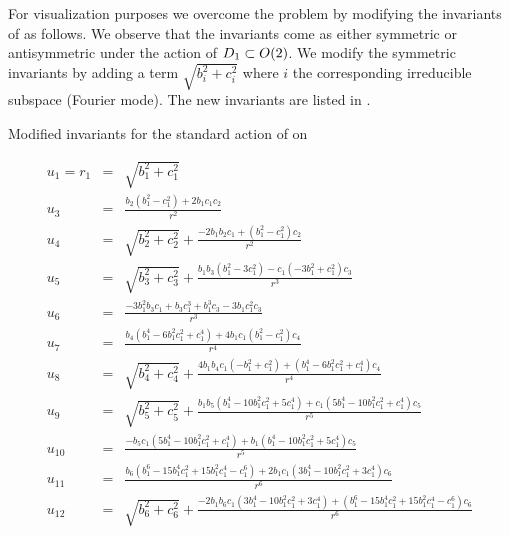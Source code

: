 For visualization purposes we overcome the problem by modifying
the invariants of  as follows. We observe
that the invariants come as either symmetric or antisymmetric
under the action of $D_{1}\subset O(2)$. We modify the
symmetric invariants by adding a term $\sqrt{b_i^2+c_i^2}$
where $i$ the corresponding irreducible subspace  (Fourier
mode). The new invariants are listed in
.

\begin{table}
\caption[Modified invariants for $\SOn{2}, n=6$]
{Modified invariants for the standard action of  on }
\label{tab:SO2n6modif}
\begin{small}
\begin{eqnarray*}
  u_1=r_1 &=&\sqrt{b_1^2+c_1^2}\\
  u_3 &=&\frac{b_2 \left(b_1^2-c_1^2\right)+2 b_1 c_1 c_2}{r^2}\\
  u_4 &=&\sqrt{b_2^2+c_2^2}+\frac{-2
b_1 b_2 c_1+\left(b_1^2-c_1^2\right) c_2}{r^2}\\
  u_5 &=&\sqrt{b_3^2+c_3^2}+\frac{b_1 b_3 \left(b_1^2-3 c_1^2\right)-c_1 \left(-3
b_1^2+c_1^2\right) c_3}{r^3}\\
  u_6 &=&\frac{-3 b_1^2 b_3 c_1+b_3 c_1^3+b_1^3 c_3-3 b_1 c_1^2 c_3}{r^3}\\
  u_7 &=&\frac{b_4
\left(b_1^4-6 b_1^2 c_1^2+c_1^4\right)+4 b_1 c_1 \left(b_1^2-c_1^2\right) c_4}{r^4}\\
  u_8 &=&\sqrt{b_4^2+c_4^2}+\frac{4 b_1
b_4 c_1 \left(-b_1^2+c_1^2\right)+\left(b_1^4-6 b_1^2 c_1^2+c_1^4\right) c_4}{r^4}\\
  u_9 &=&\sqrt{b_5^2+c_5^2}+\frac{b_1
b_5 \left(b_1^4-10 b_1^2 c_1^2+5 c_1^4\right)+c_1 \left(5 b_1^4-10 b_1^2 c_1^2+c_1^4\right) c_5}{r^5}\\
  u_{10} &=&\frac{-b_5
c_1 \left(5 b_1^4-10 b_1^2 c_1^2+c_1^4\right)+b_1 \left(b_1^4-10 b_1^2 c_1^2+5 c_1^4\right) c_5}{r^5}\\
  u_{11} &=&\frac{b_6
\left(b_1^6-15 b_1^4 c_1^2+15 b_1^2 c_1^4-c_1^6\right)+2 b_1 c_1 \left(3 b_1^4-10 b_1^2 c_1^2+3 c_1^4\right) c_6}{r^6} \\
  u_{12} &=&\sqrt{b_6^2+c_6^2}+\frac{-2
b_1 b_6 c_1 \left(3 b_1^4-10 b_1^2 c_1^2+3 c_1^4\right)+\left(b_1^6-15 b_1^4 c_1^2+15 b_1^2 c_1^4-c_1^6\right) c_6}{r^6}
\end{eqnarray*}
\end{small}
\end{table}

